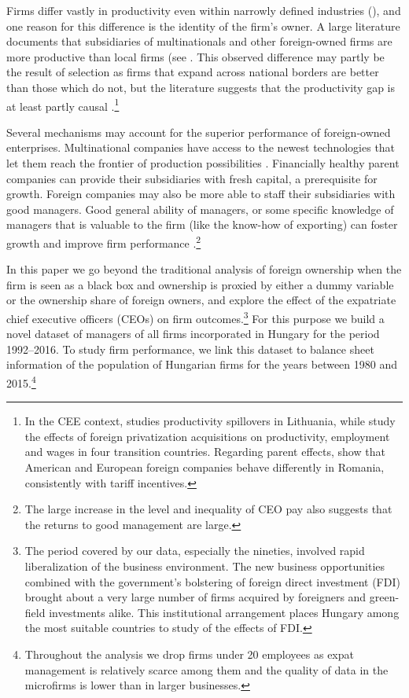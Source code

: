 \documentclass[12pt,a4paper]{article}
\begin{document}
Firms differ vastly in productivity even within narrowly defined industries (\cite{Syverson2011-ti}), and one reason for this difference is the identity of the firm's owner. A large literature documents that subsidiaries of multinationals and other foreign-owned firms are more productive than local firms (see \cite{Doms1998-su,Barba_Navaretti2004-cs}. This observed difference may partly be the result of selection as firms that expand across national borders are better than those which do not, but the literature suggests that the productivity gap is at least partly causal \cite{Arnold2009-so}.\footnote{In the CEE context, \cite{Javorcik2004-gz} studies productivity spillovers in Lithuania, while \cite{David_Brown2010-iz,Brown2006-rn} study the effects of foreign privatization acquisitions on productivity, employment and wages in four transition countries. Regarding parent effects, \cite{Javorcik2011-uj} show that American and European foreign companies behave differently in Romania, consistently with tariff incentives.} 

Several mechanisms may account for the superior performance of foreign-owned enterprises. Multinational companies have access to the newest technologies that let them reach the frontier of production possibilities \cite{guadalupe2012innovation}. Financially healthy parent companies can provide their subsidiaries with fresh capital, a prerequisite for growth\cite{levine2005finance}. Foreign companies may also be more able to staff their subsidiaries with good managers. Good general ability of managers, or some specific knowledge of managers that is valuable to the firm (like the know-how of exporting) can foster growth and improve firm performance \cite{Bertrand2003-io, Bloom2010-je,Bloom2012-ek,Bloom2014-ux}.\footnote{The large increase in the level and inequality of CEO pay \cite{frydman2010executive} also suggests that the returns to good management are large.}

In this paper we go beyond the traditional analysis of foreign ownership when the firm is seen as a black box and ownership is proxied by either a dummy variable or the ownership share of foreign owners, and explore the effect of the expatriate chief executive officers (CEOs) on firm outcomes.\footnote{The period covered by our data, especially the nineties, involved rapid liberalization of the business environment. The new business opportunities combined with the government's bolstering of foreign direct investment (FDI) brought about a very large number of firms acquired by foreigners and green-field investments alike. This institutional arrangement places Hungary among the most suitable countries to study of the effects of FDI.} For this purpose we build a novel dataset of managers of all firms incorporated in Hungary for the period 1992--2016. To study firm performance, we link this dataset to balance sheet information of the population of Hungarian firms for the years between 1980 and 2015.\footnote{Throughout the analysis we drop firms under 20 employees as expat management is relatively scarce among them and the quality of data in the microfirms is lower than in larger businesses.}
\end{document}
